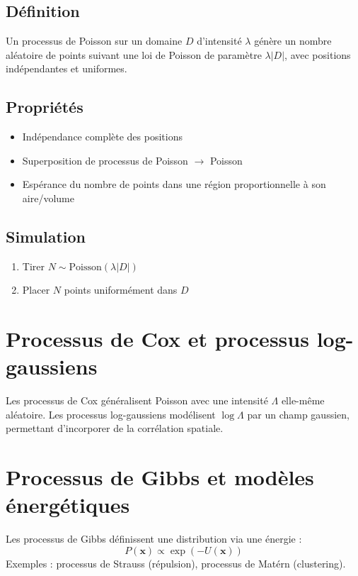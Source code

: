 \subsection{Définition}
Un processus de Poisson sur un domaine $D$ d'intensité $\lambda$ génère un nombre aléatoire de points suivant une loi de Poisson de paramètre $\lambda |D|$, avec positions indépendantes et uniformes.

\subsection{Propriétés}
\begin{itemize}
    \item Indépendance complète des positions
    \item Superposition de processus de Poisson $\rightarrow$ Poisson
    \item Espérance du nombre de points dans une région proportionnelle à son aire/volume
\end{itemize}

\subsection{Simulation}
\begin{enumerate}
    \item Tirer $N \sim \text{Poisson}(\lambda |D|)$
    \item Placer $N$ points uniformément dans $D$
\end{enumerate}

\section{Processus de Cox et processus log-gaussiens}

Les processus de Cox généralisent Poisson avec une intensité $\Lambda$ elle-même aléatoire. Les processus log-gaussiens modélisent $\log \Lambda$ par un champ gaussien, permettant d'incorporer de la corrélation spatiale.

\section{Processus de Gibbs et modèles énergétiques}

Les processus de Gibbs définissent une distribution via une énergie :
\[
P(\mathbf{x}) \propto \exp(-U(\mathbf{x}))
\]
Exemples : processus de Strauss (répulsion), processus de Matérn (clustering).

